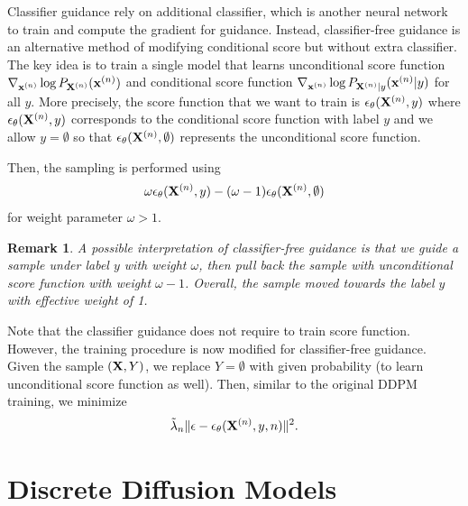 \documentclass[11pt, a4paper]{article}
\newtheorem{remark}{Remark}
\begin{document}
Classifier guidance rely on additional classifier, which is another neural network to train and compute the gradient for guidance.
Instead, classifier-free guidance is an alternative method of modifying conditional score but without extra classifier.
The key idea is to train a single model that learns unconditional score function $\nabla_{{\bf x}^{(n)}} \log P_{{\bf X}^{(n)}}({\bf x}^{(n)})$ and
conditional score function $\nabla_{{\bf x}^{(n)}} \log P_{{\bf X}^{(n)}|y}({\bf x}^{(n)}|y)$ for all $y$.
More precisely, the score function that we want to train is $\epsilon_\theta({\bf X}^{(n)}, y)$ where
$\epsilon_\theta({\bf X}^{(n)}, y)$ corresponds to the conditional score function with label $y$
and we allow $y=\emptyset$ so that $\epsilon_\theta({\bf X}^{(n)}, \emptyset)$ represents the unconditional score function.

Then, the sampling is performed using
\begin{align}
    \omega \epsilon_{\theta}({\bf X}^{(n)}, y) -  (\omega-1) \epsilon_{\theta}({\bf X}^{(n)}, \emptyset) 
\end{align}
for weight parameter $\omega > 1$.
\begin{remark}
    A possible interpretation of classifier-free guidance is that we guide a sample under label $y$ with weight $\omega$,
    then pull back the sample with unconditional score function with weight $\omega-1$.
    Overall, the sample moved towards the label $y$ with effective weight of 1.
\end{remark}

Note that the classifier guidance does not require to train score function.
However, the training procedure is now modified for classifier-free guidance.
Given the sample $({\bf X}, Y)$, we replace $Y=\emptyset$ with given probability (to learn unconditional score function as well).
Then, similar to the original DDPM training, we minimize
\begin{align}
     \tilde{\lambda}_n \| \epsilon - \epsilon_{\theta}({\bf X}^{(n)}, y, n)\|^2.
\end{align}



\section{Discrete Diffusion Models}
\end{document}
